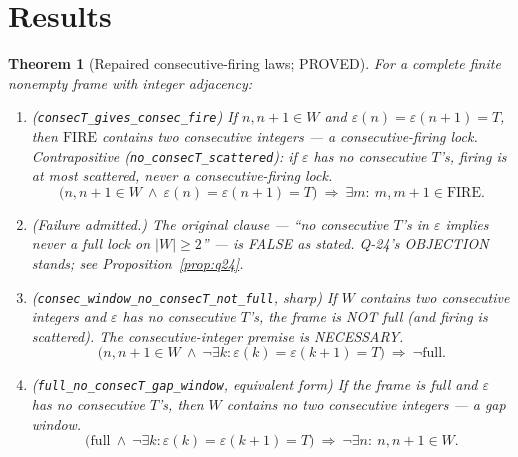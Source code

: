 \documentclass[11pt,a4paper]{article}
\newtheorem{theorem}{Theorem}
\theoremstyle{definition}
\begin{document}
\section{Results}

\begin{theorem}[Repaired consecutive-firing laws; PROVED]
  \label{thm:locks}
  For a complete finite nonempty frame with integer adjacency:
  \begin{enumerate}
  \item[(a)] (\texttt{consecT\_gives\_consec\_fire}) If $n,n+1\in W$
    and $\varepsilon(n)=\varepsilon(n+1)=T$, then $\mathrm{FIRE}$
    contains two consecutive integers --- a consecutive-firing lock.
    Contrapositive (\texttt{no\_consecT\_scattered}): if $\varepsilon$
    has no consecutive $T$'s, firing is at most scattered, never a
    consecutive-firing lock.
    \begin{equation}
      \label{eq:locka}
      \bigl(n,n{+}1\in W\ \land\ \varepsilon(n)=\varepsilon(n{+}1)=T\bigr)
      \ \Longrightarrow\ \exists m:\ m,m{+}1\in\mathrm{FIRE}.
    \end{equation}
  \item[(b)] (Failure admitted.) The original clause --- ``no
    consecutive $T$'s in $\varepsilon$ implies never a full lock on
    $|W|\ge2$'' --- is FALSE as stated. Q-24's OBJECTION stands; see
    Proposition~\ref{prop:q24}.
  \item[(c)(i)] (\texttt{consec\_window\_no\_consecT\_not\_full},
    sharp) If $W$ contains two consecutive integers and $\varepsilon$
    has no consecutive $T$'s, the frame is NOT full (and firing is
    scattered). The consecutive-integer premise is NECESSARY.
    \begin{equation}
      \label{eq:lockci}
      \bigl(n,n{+}1\in W\ \land\ \lnot\exists k:\varepsilon(k)
        =\varepsilon(k{+}1)=T\bigr)\ \Longrightarrow\ \lnot\mathrm{full}.
    \end{equation}
  \item[(c)(ii)] (\texttt{full\_no\_consecT\_gap\_window}, equivalent
    form) If the frame is full and $\varepsilon$ has no consecutive
    $T$'s, then $W$ contains no two consecutive integers --- a gap
    window.
    \begin{equation}
      \label{eq:lockcii}
      \bigl(\mathrm{full}\ \land\ \lnot\exists k:\varepsilon(k)
        =\varepsilon(k{+}1)=T\bigr)\ \Longrightarrow\
        \lnot\exists n:\ n,n{+}1\in W.
    \end{equation}
  \end{enumerate}
\end{theorem}
\end{document}
